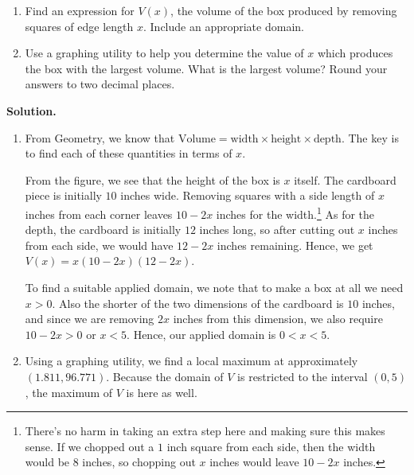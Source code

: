 \documentclass{ximera}
\begin{document}
\begin{example}
\begin{enumerate}

\item  Find an expression for $V(x)$, the volume of the box produced by removing squares of edge length $x$. Include an appropriate domain.

\item  Use a graphing utility to help you determine the value of $x$ which produces the box with the largest volume.  What is the largest volume?  Round your answers to two decimal places.

\end{enumerate}

{\bf Solution.} 

\begin{enumerate}

\item  From Geometry, we know that $\text{Volume} = \text{width} \times \text{height} \times \text{depth}$.  The key is to find each of these quantities in terms of $x$.  

\medskip

From the figure, we see that the height of the box is $x$ itself.  The cardboard piece is initially $10$ inches wide.  Removing squares with a side length of $x$ inches from each corner leaves $10-2x$ inches for the width.\footnote{There's no harm in taking an extra step here and making sure this makes sense.  If we chopped out a $1$ inch square from each side, then the width would be $8$ inches, so chopping out $x$ inches would leave $10-2x$ inches.}   As for the depth, the cardboard is initially $12$ inches long, so after cutting out $x$ inches from each side, we would have $12-2x$ inches remaining. Hence, we get $V(x) = x(10-2x)(12-2x)$.  

\medskip

To find a suitable applied domain, we note that to make a box at all we need $x > 0$.  Also the shorter of the two dimensions of the cardboard is $10$ inches, and since we are removing $2x$ inches from this dimension, we also require $10 - 2x > 0$ or $x < 5$.  Hence, our applied domain is $0 < x < 5$.

\item  Using a graphing utility, we find a local maximum at approximately $(1.811, 96.771)$.  Because the domain of $V$ is restricted to the interval $(0,5)$,  the maximum of $V$ is here as well.

\begin{center}


\end{center}
\end{enumerate}
\end{example}
\end{document}
